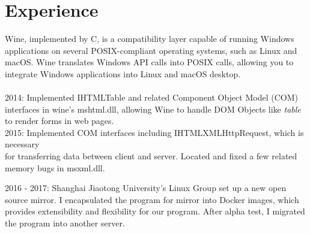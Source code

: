 

\section{Experience}

{
	{Wine, implemented by C, is a compatibility layer capable of running Windows applications on several %
	POSIX-compliant operating systems, such as Linux and macOS. Wine translates Windows API %
	calls into POSIX calls, allowing you to integrate Windows applications into Linux and %
	macOS desktop.\\ \\}
	{2014: Implemented IHTMLTable and related Component Object Model (COM) interfaces in wine's mshtml.dll, allowing Wine to handle DOM Objects like \textit{table} to render forms in web pages.}\\
	{2015: Implemented COM interfaces including IHTMLXMLHttpRequest, which is necessary \\
	for transferring data between client and server. Located and fixed a few related memory bugs in msxml.dll.}
}





{
2016 - 2017: Shanghai Jiaotong University's Linux Group set up a new open source mirror.
I encapsulated the program for mirror into Docker images, which provides extensibility
and flexibility for our program. After alpha test, I migrated the program into another server.
}

\vspace{-5mm}

